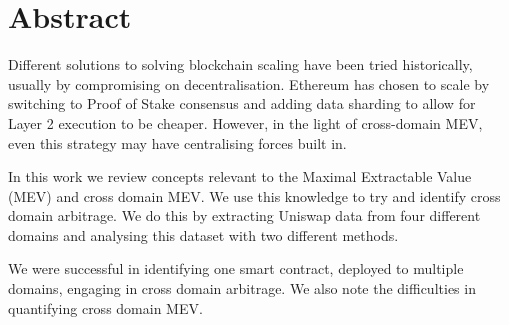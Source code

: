 \setcounter{page}{0}
\section*{Abstract}

Different solutions to solving blockchain scaling have been tried historically, usually by compromising on decentralisation. Ethereum has chosen to scale by switching to Proof of Stake consensus and adding data sharding to allow for Layer 2 execution to be cheaper. However, in the light of cross-domain MEV, even this strategy may have centralising forces built in.

In this work we review concepts relevant to the Maximal Extractable Value (MEV) and cross domain MEV. We use this knowledge to try and identify cross domain arbitrage. We do this by extracting Uniswap data from four different domains and analysing this dataset with two different methods. 

We were successful in identifying one smart contract, deployed to multiple domains, engaging in cross domain arbitrage. We also note the difficulties in quantifying cross domain MEV.

\newpage









